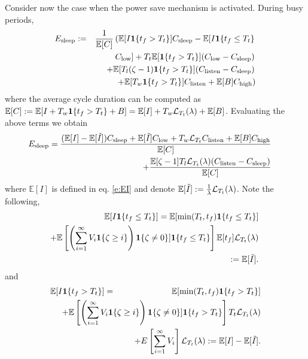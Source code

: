\documentclass[journal]{IEEEtran}
\newcommand {\bear} {\begin{eqnarray}}
\newcommand {\eear} {\end{eqnarray}}
\def \E{{\mathbb E}}
\def\bone{{\mathrm 1\!\!I}}
\def\bone{{\textbf 1}}
\begin{document}
Consider now the case when the power save mechanism is activated. During busy periods, \bear
\nonumber
E_{\textrm{sleep}}&:=&\frac{1}{{\E[C]}} \left(\E[I\bone\{t_f>T_t\}]C_{\textrm{sleep}}-\E[I\bone\{t_f\leq T_t\}\right.\\
&&\left. C_{\textrm{low}}]+ T_t\E[\bone\{t_f>T_t\}](C_{\textrm
{low}}-C_{\textrm
{sleep}})\right.\nonumber\\
&&\left.+\E[T_l(\zeta-1)\bone\{t_f>T_t\}](C_{\textrm{listen}}-C_{\textrm{sleep}}) \nonumber\right.\\
&&\left.+\E[T_w\bone\{t_f>T_t\}]C_{\textrm{listen}}
+\E[B]C_{\textrm{high}} \right)
\label{e:Esleep}
\eear
where the average cycle duration can be computed as \small{ $\E[C]:=\E[I+T_w\bone\{t_f>T_t\}+B]=\E[I]+T_w{\cal L}_{T_t}(\lambda)+\E[B]$.}
Evaluating the above terms we obtain
\bear
\nonumber
&&\nonumber \hspace{-8mm}E_{\textrm{sleep}}=\frac{ (\E[I]-\E[\tilde{I}])C_{\textrm{sleep}}+\E[\tilde{I}]C_{\textrm{low}} +T_w {\cal L}_{T_t}C_{\textrm
{listen}} +\E[B]C_{\textrm{high}}}{\E[C]}\\&&+\frac{\E[\zeta-1]T_l{\cal L}_{T_t}(\lambda) (C_{\textrm{listen}}-C_{\textrm{sleep}})}{\E[C]}
\label{e:Esleep1}
\eear
where $\E[I]$ is defined in eq. \eqref{e:EI} and denote $\E[\tilde{I}]:=\frac{1}{\lambda}{\cal L}_{T_t}(\lambda)$.
Note the following,
\bear
\nonumber
&&\hspace{-8mm}\E[I\bone\{t_f\leq T_t\}]=\E[\min(T_t,t_f)\bone\{t_f\leq T_t\}]\\&&\hspace{-4mm}+\E\left[\left(\sum_{i=1}^{\infty} V_i{\bone {\{\zeta \geq i\}}}\right){\bone {\{\zeta\neq 0\}}}]\bone\{t_f\leq T_t\}\right]\E[t_f] {\cal L}_{T_t}(\lambda)\nonumber\\
&&\hspace{15mm}:=\E[\tilde{I}].
\eear
and
\bear
\nonumber
\E[I\bone\{t_f>T_t\}]&=&\E[\min(T_t,t_f)\bone\{t_f>T_t\}]\\
&&\hspace{-25mm}+\E\left[\left(\sum_{i=1}^{\infty} V_i{\bone {\{\zeta \geq i\}}}\right){\bone {\{\zeta\neq 0\}}}]\bone\{t_f>T_t\}\right]T_t {\cal L}_{T_t}(\lambda)\nonumber \\&&\hspace{-25mm}+E\left[\sum_{i=1}^{\infty} V_i\right] {\cal L}_{T_t}(\lambda):=\E[I]-\E[\tilde{I}].
\eear
\end{document}
